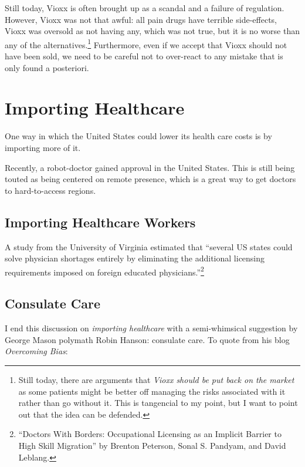 Still today, Vioxx is often brought up as a scandal and a failure of
regulation. However, Vioxx was not that awful: all pain drugs have terrible
side-effects, Vioxx was oversold as not having any, which was not true, but it
is no worse than any of the alternatives.\footnote{Still today, there are
arguments that \emph{Vioxx should be put back on the market} as some patients
might be better off managing the risks associated with it rather than go
without it. This is tangencial to my point, but I want to point out that the
idea can be defended.} Furthermore, even if we accept that Vioxx should not
have been sold, we need to be careful not to over-react to any mistake that is
only found a posteriori.

\section{Importing Healthcare}

One way in which the United States could lower its health care costs is by
importing more of it.

Recently, a robot-doctor gained approval in the United States. This is still
being touted as being centered on remote presence, which is a great way to get
doctors to hard-to-access regions.


\subsection{Importing Healthcare Workers}

A study from the University of Virginia estimated that ``several US states
could solve physician shortages entirely by eliminating the additional
licensing requirements imposed on foreign educated
physicians.''\footnote{``Doctors With Borders: Occupational Licensing as an
Implicit Barrier to High Skill Migration'' by Brenton Peterson, Sonal S.
Pandyam, and David Leblang.}

\subsection{Consulate Care}

I end this discussion on \emph{importing healthcare} with a semi-whimsical
suggestion by George Mason polymath Robin Hanson: consulate care. To quote from
his blog \emph{Overcoming Bias}:

